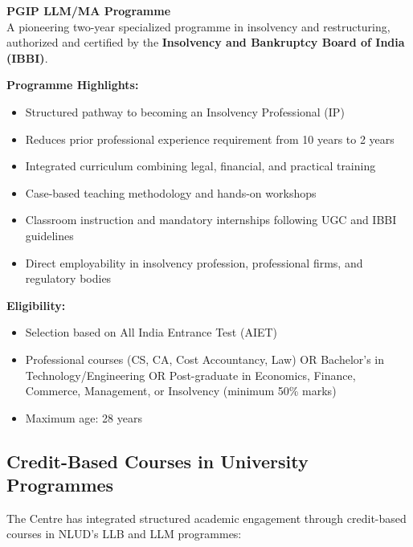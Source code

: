 \documentclass[11pt,a4paper]{article}
\begin{document}
\begin{tcolorbox}[colback=ink!5,colframe=oxblood,arc=2mm]
\textbf{\headingfont PGIP LLM/MA Programme}\\[0.3cm]
A pioneering two-year specialized programme in insolvency and restructuring, authorized and certified by the \textbf{Insolvency and Bankruptcy Board of India (IBBI)}.
\end{tcolorbox}

\vspace{0.3cm}

\textbf{Programme Highlights:}
\begin{itemize}[leftmargin=*,itemsep=0.2cm]
    \item Structured pathway to becoming an Insolvency Professional (IP)
    \item Reduces prior professional experience requirement from 10 years to 2 years
    \item Integrated curriculum combining legal, financial, and practical training
    \item Case-based teaching methodology and hands-on workshops
    \item Classroom instruction and mandatory internships following UGC and IBBI guidelines
    \item Direct employability in insolvency profession, professional firms, and regulatory bodies
\end{itemize}

\vspace{0.3cm}

\textbf{Eligibility:}
\begin{itemize}[leftmargin=*,itemsep=0.1cm]
    \item Selection based on All India Entrance Test (AIET)
    \item Professional courses (CS, CA, Cost Accountancy, Law) OR Bachelor's in Technology/Engineering OR Post-graduate in Economics, Finance, Commerce, Management, or Insolvency (minimum 50\% marks)
    \item Maximum age: 28 years
\end{itemize}

\vspace{0.5cm}

\subsection*{Credit-Based Courses in University Programmes}

The Centre has integrated structured academic engagement through credit-based courses in NLUD's LLB and LLM programmes:
\end{document}
